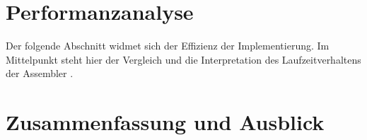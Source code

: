\documentclass[course=erap]{aspdoc}
\begin{document}
\section{Performanzanalyse}
Der folgende Abschnitt widmet sich der Effizienz der Implementierung. Im Mittelpunkt steht hier der Vergleich und die Interpretation des Laufzeitverhaltens der Assembler .


\section{Zusammenfassung und Ausblick}


{}
\end{document}
